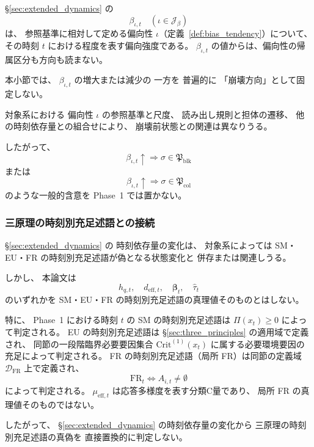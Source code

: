 \begin{remark}[偏向強度の変化を崩壊方向と固定しない]
\label{rem:beta_not_fixed_collapse_direction}
\S\ref{sec:extended_dynamics} の
\[
  \beta_{\iota,t}\quad(\iota\in\mathcal J_{\beta})
\]
は、
参照基準に相対して定める偏向性 $\iota$（定義~\ref{def:bias_tendency}）について、
その時刻 $t$ における程度を表す偏向強度である。
$\beta_{\iota,t}$ の値からは、偏向性の帰属区分も方向も読まない。

本小節では、
$\beta_{\iota,t}$ の増大または減少の
一方を
普遍的に
「崩壊方向」として固定しない。

対象系における
偏向性 $\iota$ の参照基準と尺度、
読み出し規則と担体の遷移、
他の時刻依存量との組合せにより、
崩壊前状態との関連は異なりうる。

したがって、
\[
  \beta_{\iota,t}\uparrow
  \Longrightarrow
  \sigma\in\mathfrak{P}_{\mathrm{blk}}
\]
または
\[
  \beta_{\iota,t}\uparrow
  \Longrightarrow
  \sigma\in\mathfrak{P}_{\mathrm{col}}
\]
のような一般的含意を
Phase~1 では置かない。
\end{remark}

\subsubsection{三原理の時刻別充足述語との接続}

\begin{remark}[内部時刻量と三原理の時刻別充足述語を同一視しない]
\label{rem:internal_quantities_not_principles}
\S\ref{sec:extended_dynamics} の
時刻依存量の変化は、
対象系によっては
SM・EU・FR の時刻別充足述語が偽となる状態変化と
併存または関連しうる。

しかし、
本論文は
\[
  h_{q,t},
  \quad
  d_{\mathrm{eff},t},
  \quad
  \boldsymbol{\beta}_t,
  \quad
  \widehat{\tau}_{t}
\]
のいずれかを
SM・EU・FR の時刻別充足述語の真理値そのものとはしない。

特に、
Phase~1 における時刻 $t$ の SM の時刻別充足述語は
$\Pi(x_t)\ge0$
によって判定される。
EU の時刻別充足述語は
\S\ref{sec:three_principles} の適用域で定義され、
同節の一段階臨界必要要因集合 $\mathrm{Crit}^{(1)}(x_t)$ に属する必要環境要因の充足によって判定される。
FR の時刻別充足述語（局所 FR）は同節の定義域
$\mathcal{D}_{\mathrm{FR}}$
上で定義され、
\[
  \mathrm{FR}_t
  \Longleftrightarrow
  A_{i,t}\neq\emptyset
\]
によって判定される。
$\mu_{\mathrm{eff},t}$ は応答多様度を表す分類C量であり、
局所 FR の真理値そのものではない。

したがって、
\S\ref{sec:extended_dynamics} の時刻依存量の変化から
三原理の時刻別充足述語の真偽を
直接置換的に判定しない。
\end{remark}

